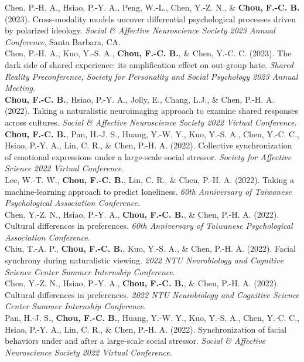 \documentclass[a4paper,12pt]{article}
\newcommand{\itemspace}{7pt} %
\begin{document}
\noindent Chen, P.-H. A., Hsiao, P.-Y. A., Peng, W.-L., Chen, Y.-Z. N., \& \textbf{Chou, F.-C. B.} (2023). Cross-modality models uncover differential psychological processes driven by polarized ideology. \textit{Social \& Affective Neuroscience Society 2023 Annual Conference}, Santa Barbara, CA.\\[\itemspace]
\noindent Chen, P.-H. A., Kuo, Y.-S. A., \textbf{Chou, F.-C. B.}, \& Chen, Y.-C. C. (2023). The dark side of shared experience: its amplification effect on out-group hate. \textit{Shared Reality Preconference, Society for Personality and Social Psychology 2023 Annual Meeting}.\\[\itemspace]
\noindent \textbf{Chou, F.-C. B.}, Hsiao, P.-Y. A., Jolly, E., Chang, L.J., \& Chen, P.-H. A. (2022). Taking a naturalistic neuroimaging approach to examine shared responses across cultures. \textit{Social \& Affective Neuroscience Society 2022 Virtual Conference}.\\[\itemspace]
\noindent \textbf{Chou, F.-C. B.}, Pan, H.-J. S., Huang, Y.-W. Y., Kuo, Y.-S. A., Chen, Y.-C. C., Hsiao, P.-Y. A., Lin, C. R., \& Chen, P.-H. A. (2022). Collective synchronization of emotional expressions under a large-scale social stressor. \textit{Society for Affective Science 2022 Virtual Conference}.\\[\itemspace]
\noindent Lee, W.-T. W., \textbf{Chou, F.-C. B.}, Lin, C. R., \& Chen, P.-H. A. (2022). Taking a machine-learning approach to predict loneliness. \textit{60th Anniversary of Taiwanese Psychological Association Conference}.\\[\itemspace]
\noindent Chen, Y.-Z. N., Hsiao, P.-Y. A., \textbf{Chou, F.-C. B.}, \& Chen, P.-H. A. (2022). Cultural differences in preferences. \textit{60th Anniversary of Taiwanese Psychological Association Conference}.\\[\itemspace]
\noindent Chiu, T.-A. P., \textbf{Chou, F.-C. B.}, Kuo, Y.-S. A., \& Chen, P.-H. A. (2022). Facial synchrony during naturalistic viewing. \textit{2022 NTU Neurobiology and Cognitive Science Center Summer Internship Conference}.\\[\itemspace]
\noindent Chen, Y.-Z. N., Hsiao, P.-Y. A., \textbf{Chou, F.-C. B.}, \& Chen, P.-H. A. (2022). Cultural differences in preferences. \textit{2022 NTU Neurobiology and Cognitive Science Center Summer Internship Conference}.\\[\itemspace]
\noindent Pan, H.-J. S., \textbf{Chou, F.-C. B.}, Huang, Y.-W. Y., Kuo, Y.-S. A., Chen, Y.-C. C., Hsiao, P.-Y. A., Lin, C. R., \& Chen, P.-H. A. (2022). Synchronization of facial behaviors under and after a large-scale social stressor. \textit{Social \& Affective Neuroscience Society 2022 Virtual Conference}.\\[\itemspace]
\end{document}
